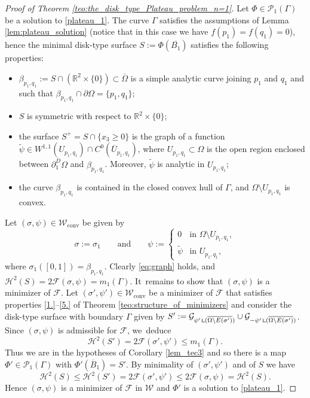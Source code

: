 \documentclass[JEP,XML,SOM,Unicode, NoFloatCountersInSection,published]{cedram}
\newcommand{\R}{\mathbb{R}}
\let\Om\Omega
\newcommand\admclassconv{{\mathcal W_\mathrm{conv}}}
\newcommand{\resa}{\mathop{\hbox{\vrule height 7pt width 0.5pt depth 0pt
\vrule height 0.5pt width 6pt depth 0pt}}\nolimits}
\newcommand{\resb}{\mathop{\hbox{\vrule height 4pt width 0.5pt depth 0pt
\vrule height 0.5pt width 3pt depth 0pt}}\nolimits}
\newcommand{\res}{\mathchoice{\resa}{\resa}{\resb}{\resb}}
\theoremstyle{definition}
\begin{document}
\begin{proof}[Proof of Theorem \ref{teo:the_disk_type_Plateau_problem_n=1}] Let $\Phi\in\mathcal{P}_1(\Gamma)$ be a solution to \eqref{plateau_1}.
The curve $\Gamma$
satisfies the assumptions
of Lemma \ref{lem:plateau_solution} (notice that in this case we have $f(p_1) = f(q_1)=0$), hence the minimal disk-type surface $S:=\Phi(\overline{B_1})$ satisfies the following properties:
\begin{itemize}
\item $\beta_{p_1,q_1}:=S\cap (\R^2\times\{0\})\subset \overline \Om$
is a simple analytic curve
joining $p_1$ and $q_1$ and such that $\beta_{p_1,q_1}\cap\partial\Om=\{p_1,q_1\}$;
\item $S$ is symmetric with respect to $\R^2\times\{0\}$;
\item the surface $S^+=S\cap\{x_3\ge0\}$ is the graph of a
function $\widetilde\psi\in W^{1,1}(U_{p_1,q_1})\cap C^0(\overline U_{p_1,q_1})$, where $U_{p_1,q_1}\subset \Om$ is the open region enclosed between $\partial_1^D\Om$ and $\beta_{p_1,q_1}$. Moreover, $\widetilde\psi$ is analytic in $U_{p_1,q_1}$;
\item the curve $\beta_{p_1,q_1}$ is contained in the closed
convex hull of $\Gamma$, and $\Om\setminus U_{p_1,q_1}$ is convex.
\end{itemize}

Let $(\sigma,\psi)\in\admclassconv$ be given by
\[
\sigma:=\sigma_1\qquad\text{and}\qquad
\psi:=\begin{cases}
0& \text{in } \Om\setminus U_{p_1,q_1},\\
\widetilde\psi & \text{in } U_{p_1,q_1},
\end{cases}
\]
where $\sigma_1([0,1])=\beta_{p_1,q_1}$.
Clearly \eqref{eq:graph} holds, and $\mathcal H^2(S)=2\mathcal F(\sigma,\psi)=m_1(\Gamma)$. It~remains to show that $(\sigma,\psi)$ is a minimizer of $\mathcal F$.
Let $(\sigma',\psi')\in\admclassconv$ be a minimizer of $\mathcal F$ that satisfies properties \ref{1.}--\ref{5.} of Theorem \ref{teo:structure_of_minimizers} and consider the disk-type surface with boundary $\Gamma$ given by $S':=\mathcal{G}_{\psi'\res(\overline{\Om\setminus E(\sigma')})}
\cup \mathcal{G}_{-\psi'\res(\overline{\Om\setminus E(\sigma')})}$.
Since $(\sigma,\psi)$ is admissible for $\mathcal F$, we~deduce
\[
\mathcal{H}^2(S')=2\mathcal F(\sigma',\psi')\leq m_1(\Gamma).
\]
Thus we are in the hypotheses of Corollary \ref{lem_tec3} and so there is a map
$\Phi'\in \mathcal P_1(\Gamma) $ with $\Phi'(\overline B_1)=S'$.
By minimality of $(\sigma',\psi')$ and of $S$ we have
\begin{equation}
\mathcal H^2(S)\le \mathcal{H}^2(S')=2\mathcal{F}(\sigma',\psi')\le 2\mathcal{F}(\sigma,\psi)=\mathcal H^2(S).
\end{equation}
Hence $(\sigma,\psi)$ is a minimizer of $\mathcal F$ in $\mathcal W$ and $\Phi'$ is a solution to \eqref{plateau_1}.


\end{proof}
\end{document}
